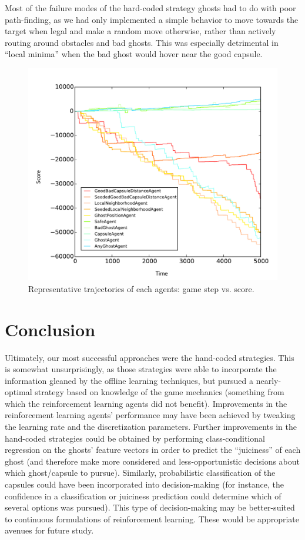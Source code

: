 \documentclass[11pt]{amsart}
\begin{document}
Most of the failure modes of the hard-coded strategy ghosts had to do with poor path-finding, as we had only implemented a simple behavior to move towards the target when legal and make a random move otherwise, rather than actively routing around obstacles and bad ghosts. This was especially detrimental in ``local minima'' when the bad ghost would hover near the good capsule.

\begin{figure}
	\includegraphics[width=\textwidth]{agents-trajectories.pdf}
	\caption{Representative trajectories of each agents: game step vs. score.}
	\label{fig:agents-trajectories}
\end{figure}


\section{Conclusion}

Ultimately, our most successful approaches were the hand-coded strategies. This is somewhat unsurprisingly, as those strategies were able to incorporate the information gleaned by the offline learning techniques, but pursued a nearly-optimal strategy based on knowledge of the game mechanics (something from which the reinforcement learning agents did not benefit). Improvements in the reinforcement learning agents' performance may have been achieved by tweaking the learning rate and the discretization parameters. Further improvements in the hand-coded strategies could be obtained by performing class-conditional regression on the ghosts' feature vectors in order to predict the ``juiciness'' of each ghost (and therefore make more considered and less-opportunistic decisions about which ghost/capsule to pursue). Similarly, probabilistic classification of the capsules could have been incorporated into decision-making (for instance, the confidence in a classification or juiciness prediction could determine which of several options was pursued). This type of decision-making may be better-suited to continuous formulations of reinforcement learning. These would be appropriate avenues for future study.
\end{document}
